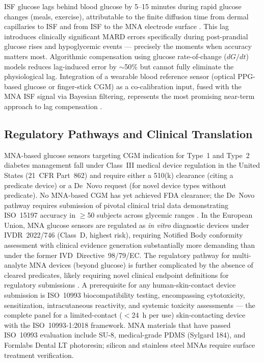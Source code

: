 \documentclass[review,1p]{elsarticle}
\begin{document}
ISF glucose lags behind blood glucose by 5--15 minutes during rapid glucose changes (meals, exercise), attributable to the finite diffusion time from dermal capillaries to ISF and from ISF to the MNA electrode surface \cite{Keum2023Lag}. This lag introduces clinically significant MARD errors specifically during post-prandial glucose rises and hypoglycemic events — precisely the moments when accuracy matters most. Algorithmic compensation using glucose rate-of-change ($dG/dt$) models reduces lag-induced error by $\sim$50\% but cannot fully eliminate the physiological lag. Integration of a wearable blood reference sensor (optical PPG-based glucose or finger-stick CGM) as a co-calibration input, fused with the MNA ISF signal via Bayesian filtering, represents the most promising near-term approach to lag compensation \cite{Wu2024Bayesian}.

\subsection{Regulatory Pathways and Clinical Translation}
\label{subsec:regulatory}

MNA-based glucose sensors targeting CGM indication for Type~1 and Type~2 diabetes management fall under Class~III medical device regulation in the United States (21~CFR Part~862) and require either a 510(k) clearance (citing a predicate device) or a De~Novo request (for novel device types without predicate). No MNA-based CGM has yet achieved FDA clearance; the De~Novo pathway requires submission of pivotal clinical trial data demonstrating ISO~15197 accuracy in $\geq$50 subjects across glycemic ranges \cite{Sempionatto2024Regulatory}. In the European Union, MNA glucose sensors are regulated as \textit{in vitro} diagnostic devices under IVDR~2022/746 (Class~D, highest risk), requiring Notified Body conformity assessment with clinical evidence generation substantially more demanding than under the former IVD~Directive~98/79/EC. The regulatory pathway for multi-analyte MNA devices (beyond glucose) is further complicated by the absence of cleared predicates, likely requiring novel clinical endpoint definitions for regulatory submissions \cite{Sempionatto2024Regulatory}. A prerequisite for any human-skin-contact device submission is ISO~10993 biocompatibility testing, encompassing cytotoxicity, sensitization, intracutaneous reactivity, and systemic toxicity assessments — the complete panel for a limited-contact ($<$24~h per use) skin-contacting device with the ISO~10993-1:2018 framework. MNA materials that have passed ISO~10993 evaluation include SU-8, medical-grade PDMS (Sylgard 184), and Formlabs Dental LT photoresin; silicon and stainless steel MNAs require surface treatment verification.
\end{document}
